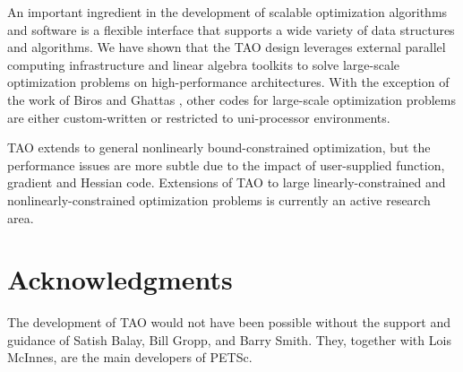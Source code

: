 An important ingredient in the development of scalable
optimization algorithms and software is a flexible interface that
supports a wide variety of data structures and algorithms.
We have shown that the TAO design leverages external
parallel computing infrastructure and
linear algebra toolkits to solve
large-scale optimization problems on high-performance
architectures.
With the exception of the work of 
Biros and Ghattas \cite{GB99b,GB99a},
other codes for large-scale optimization
problems are either custom-written
or restricted to uni-processor environments.

TAO \cite{tao-user-ref}
extends to general nonlinearly bound-constrained optimization,
but the performance issues are more subtle due to the
impact of user-supplied function, gradient and Hessian code.
Extensions of TAO to large
linearly-constrained and nonlinearly-constrained optimization
problems is currently an active research area.

\section*{Acknowledgments}

The development of TAO would not have been possible without the
support and guidance of Satish Balay,
Bill Gropp, and Barry Smith.
They, together with Lois McInnes, are the main developers of PETSc.
